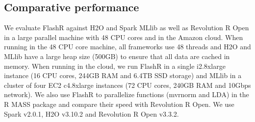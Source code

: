 \subsection{Comparative performance}
We evaluate FlashR against H2O \cite{h2o} and Spark MLlib \cite{mllib} as well
as Revolution R Open \cite{rro} in a large parallel machine with 48 CPU cores
and in the Amazon cloud. When running in the 48 CPU core machine, all frameworks
use 48 threads and H2O and MLlib have a large heap size (500GB) to ensure that
all data are cached in memory. When running in the cloud, we run FlashR
in a single i2.8xlarge instance (16 CPU cores, 244GB RAM and 6.4TB SSD storage)
and MLlib in a cluster of four EC2 c4.8xlarge instances (72 CPU cores, 240GB RAM
and 10Gbps network). We also use FlashR to parallelize functions (mvrnorm and LDA)
in the R MASS package and compare their speed with Revolution R Open. We use
Spark v2.0.1, H2O v3.10.2 and Revolution R Open v3.3.2.

